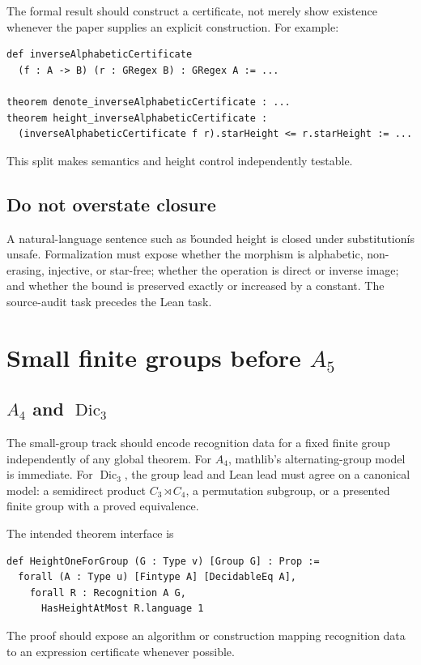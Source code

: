 \documentclass{amsart}
\begin{document}
The formal result should construct a certificate, not merely show existence whenever the paper supplies an explicit construction.  For example:
\begin{lstlisting}[language={},caption={Preferred shape for a transport theorem.}]
def inverseAlphabeticCertificate
  (f : A -> B) (r : GRegex B) : GRegex A := ...

theorem denote_inverseAlphabeticCertificate : ...
theorem height_inverseAlphabeticCertificate :
  (inverseAlphabeticCertificate f r).starHeight <= r.starHeight := ...
\end{lstlisting}
This split makes semantics and height control independently testable.

\subsection{Do not overstate closure}

A natural-language sentence such as \'bounded height is closed under substitution\' is unsafe.  Formalization must expose whether the morphism is alphabetic, non-erasing, injective, or star-free; whether the operation is direct or inverse image; and whether the bound is preserved exactly or increased by a constant.  The source-audit task precedes the Lean task.

\section{Small finite groups before $A_5$}

\subsection{$A_4$ and $\operatorname{Dic}_3$}

The small-group track should encode recognition data for a fixed finite group independently of any global theorem.  For $A_4$, mathlib's alternating-group model is immediate.  For $\operatorname{Dic}_3$, the group lead and Lean lead must agree on a canonical model: a semidirect product $C_3\rtimes C_4$, a permutation subgroup, or a presented finite group with a proved equivalence.

The intended theorem interface is
\begin{lstlisting}[language={},caption={Group-language milestone.}]
def HeightOneForGroup (G : Type v) [Group G] : Prop :=
  forall (A : Type u) [Fintype A] [DecidableEq A],
    forall R : Recognition A G,
      HasHeightAtMost R.language 1
\end{lstlisting}
The proof should expose an algorithm or construction mapping recognition data to an expression certificate whenever possible.
\end{document}
